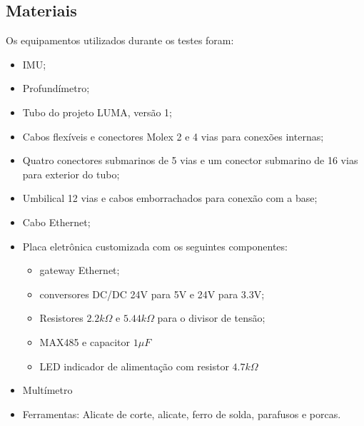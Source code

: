 



\subsection{Materiais}
Os equipamentos utilizados durante os testes foram:
\begin{itemize}
  \item IMU;
  \item Profundímetro;
  \item Tubo do projeto LUMA, versão 1;
  \item Cabos flexíveis e conectores Molex 2 e 4 vias para conexões internas;
  \item Quatro conectores submarinos de 5 vias e um conector submarino de 16
  vias para exterior do tubo;
  \item Umbilical 12 vias e cabos emborrachados para conexão com a base;
  \item Cabo Ethernet;
  \item Placa eletrônica customizada com os seguintes componentes: 
  \begin{itemize}
    \item gateway Ethernet;
    \item conversores DC/DC 24V para 5V e 24V para 3.3V;
    \item Resistores $2.2k\Omega$ e $5.44k\Omega$ para o divisor de tensão;
    \item MAX485 e capacitor $1\mu F$
    \item LED indicador de alimentação com resistor $4.7k\Omega$
  \end{itemize}
  \item Multímetro
  \item Ferramentas: Alicate de corte, alicate, ferro de solda, parafusos e
  porcas.
\end{itemize}
\label{materials}




